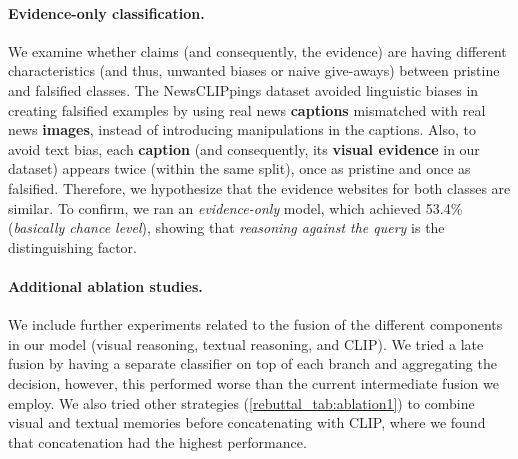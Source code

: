 \paragraph{Evidence-only classification.} We examine whether claims (and consequently, the evidence) are having different characteristics (and thus, unwanted biases or naive give-aways) between pristine and falsified classes. The NewsCLIPpings dataset avoided linguistic biases in creating falsified examples by using real news \textbf{\textcolor{myblue}{captions}} mismatched with real news \textbf{\textcolor{myOrange}{images}}, instead of introducing manipulations in the captions. Also, to avoid text bias, each \textbf{\textcolor{myblue}{caption}} (and consequently, its \textbf{\textcolor{myOrange}{visual evidence}} in our dataset) appears twice (within the same split), once as pristine and once as falsified. Therefore, we hypothesize that the evidence websites for both classes are similar. To confirm, we ran an \textit{evidence-only} model, which achieved 53.4\% (\textit{basically chance level}), showing that \textit{reasoning against the query} is the distinguishing factor.

\begin{table}[!b]
\begin{center}
\vspace{-1mm}
\end{center}
\vspace{-6mm}
\caption{Accuracy (\%) vs. aggregation strategies.}
\vspace{-3mm}
\label{rebuttal_tab:ablation1}
\end{table}

\paragraph{Additional ablation studies.} We include further experiments related to the fusion of the different components in our model (visual reasoning, textual reasoning, and CLIP). We tried a late fusion by having a separate classifier on top of each branch and aggregating the decision, however, this performed worse than the current intermediate fusion we employ. We also tried other strategies (\autoref{rebuttal_tab:ablation1}) to combine visual and textual memories before concatenating with CLIP, where we found that concatenation had the highest performance. 

